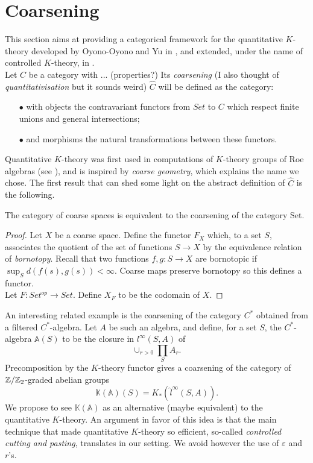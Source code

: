 \section{Coarsening}

This section aims at providing a categorical framework for the quantitative $K$-theory developed by Oyono-Oyono and Yu in \cite{OY2}, and extended, under the name of controlled $K$-theory, in \cite{Dell}.\\

Let $C$ be a category with ... (properties?) Its \textit{coarsening} (I also thought of \textit{quantitativisation} but it sounds weird) $\hat C$ will be defined as the category:
\begin{itemize}
\item[$\bullet$] with objects the contravariant functors from $Set$ to $C$ which respect finite unions and general intersections;
\item[$\bullet$] and morphisms the natural transformations between these functors.
\end{itemize}

Quantitative $K$-theory was first used in computations of $K$-theory groups of Roe algebras (see \cite{Yu}), and is inspired by \textit{coarse geometry}, which explains the name we chose. The first result that can shed some light on the abstract definition of $\hat C$ is the following.

\begin{prop}
The category of coarse spaces is equivalent to the coarsening of the category Set.
\end{prop}

\begin{proof}
Let $X$ be a coarse space. Define the functor $F_X$ which, to a set $S$, associates the quotient of the set of functions $S\rightarrow X$ by the equivalence relation of \textit{bornotopy}. Recall that two functions $f,g: S \rightarrow X$ are bornotopic if $\sup_S d(f(s),g(s)) < \infty$. Coarse maps preserve bornotopy so this defines a functor.\\

Let $F: Set^{op} \rightarrow Set$. Define $X_F$ to be the codomain of $X$. 

\end{proof} 

An interesting related example is the coarsening of the category $C^*$ obtained from a filtered $C^*$-algebra. Let $A$ be such an algebra, and define, for a set $S$, the $C^*$-algebra $\mathbb A (S)$ to be the closure in $l^\infty(S,A)$ of \[\cup_{r>0} \prod_S A_r.\] Precomposition by the $K$-theory functor gives a coarsening of the category of $\mathbb Z / \mathbb Z_2$-graded abelian groups
\[\mathbb K(\mathbb A) (S) = K_*( \hat l^\infty (S,A)).\] 
We propose to see $\mathbb K (\mathbb A)$ as an alternative (maybe equivalent) to the quantitative $K$-theory. An argument in favor of this idea is that the main technique that made quantitative $K$-theory so efficient, so-called \textit{controlled cutting and pasting}, translates in our setting. We avoid however the use of $\varepsilon$ and $r$'s.

